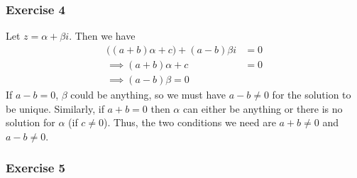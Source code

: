 \subsubsection{Exercise 4}
Let $z = \alpha + \beta i$. Then we have
\begin{align*}
        \big((a + b) \alpha + c\big) + (a - b)\beta i &= 0 \\
        \implies (a + b) \alpha + c &= 0 \\
        \implies (a - b) \beta = 0
\end{align*}
If $a - b = 0$, $\beta$ could be anything, so we must have $a - b \neq 0$ for the solution to be unique.
Similarly, if $a + b = 0$ then $\alpha$ can either be anything or there is no solution for $\alpha$ 
(if $c \neq 0$). Thus, the two conditions we need are  $a + b \neq 0$ and $a - b \neq 0$.

\subsubsection{Exercise 5}

